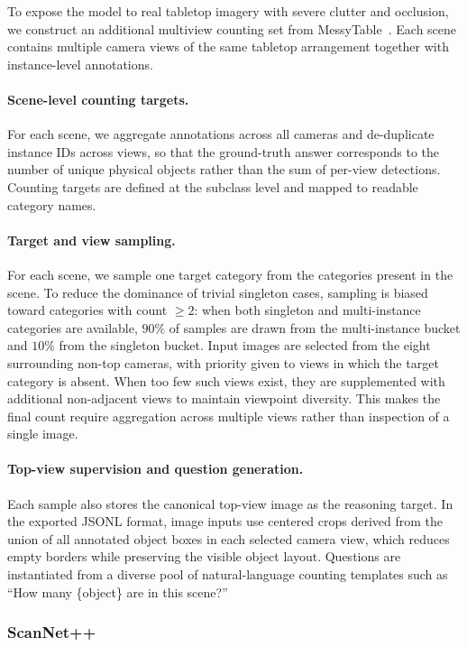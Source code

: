 To expose the model to real tabletop imagery with severe clutter and occlusion, we construct an additional multiview counting set from MessyTable~\cite{cai2020messytable}. Each scene contains multiple camera views of the same tabletop arrangement together with instance-level annotations.

\paragraph{Scene-level counting targets.}
For each scene, we aggregate annotations across all cameras and de-duplicate instance IDs across views, so that the ground-truth answer corresponds to the number of unique physical objects rather than the sum of per-view detections. Counting targets are defined at the subclass level and mapped
to readable category names.

\paragraph{Target and view sampling.}
For each scene, we sample one target category from the categories present in the scene. To reduce the dominance of trivial singleton cases, sampling is biased toward categories with count $\geq 2$: when both singleton and multi-instance categories are available, $90\%$ of samples are drawn from
the multi-instance bucket and $10\%$ from the singleton bucket. Input images are selected from the eight surrounding non-top cameras, with priority given to views in which the target category is absent. When too few such views exist, they are supplemented with additional non-adjacent views to
maintain viewpoint diversity. This makes the final count require aggregation across multiple views rather than inspection of a single image.

\paragraph{Top-view supervision and question generation.}
Each sample also stores the canonical top-view image as the reasoning target. In the exported JSONL format, image inputs use centered crops derived from the union of all annotated object boxes in each selected camera view, which reduces empty borders while preserving the visible object layout.
Questions are instantiated from a diverse pool of natural-language counting templates such as ``How many \{object\} are in this scene?''

\subsubsection{ScanNet++}


